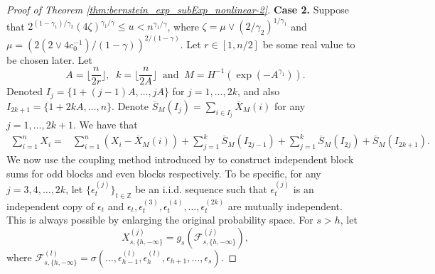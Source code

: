 \documentclass[11pt]{article}
\theoremstyle{plain}
\theoremstyle{definition}
\begin{document}
\begin{proof}[Proof of Theorem \ref{thm:bernstein_exp_subExp_nonlinear-2}]
\textbf{Case 2.} Suppose that $2^{(1-\gamma_1)/\gamma_2}(4\zeta)^{\gamma_1/\gamma} \leq u < n^{\gamma_1/\gamma}$, where $\zeta = \mu \vee (2/\gamma_2)^{1/\gamma_1}$ and $\mu = (2(2 \vee 4c_0^{-1})/(1-\gamma))^{2/(1-\gamma)}$. Let $r \in [1, n/2]$ be some real value to be chosen later. Let
\begin{equation*}
    A = \Big\lfloor \frac{n}{2r} \Big\rfloor, \;\; k = \Big\lfloor \frac{n}{2A} \Big\rfloor \;\; \text{and} \;\; M = H^{-1}(\exp(-A^{\gamma_1})).
\end{equation*}
Denoted $I_j = \{1+(j-1)A, \dots, jA\}$ for $j = 1, \dots, 2k$, and also $I_{2k+1} = \{1+2kA, \dots, n\}$. Denote $\overline{S}_M(I_j) = \sum_{i \in I_{j}}\overline{X}_M(i)$ for any $j = 1, \dots, 2k+1$. We have that
\begin{equation}\label{eq:decomp_odd_even}
\begin{aligned}
    \sum_{i = 1}^nX_i =& \sum_{i = 1}^n(X_i - \overline{X}_M(i)) + \sum_{j = 1}^k\overline{S}_M(I_{2j-1}) + \sum_{j = 1}^k\overline{S}_M(I_{2j}) + \overline{S}_M( I_{2k+1}).
\end{aligned}
\end{equation}
We now use the coupling method introduced by \cite{berkes2009asymptotic} to construct independent block sums for odd blocks and even blocks respectively. To be specific, for any $j = 3, 4, \dots, 2k$, let $\{\epsilon_t^{(j)}\}_{t \in \mathbb{Z}}$ be an i.i.d. sequence such that $\epsilon_t^{(j)}$ is an independent copy of $\epsilon_t$ and $\epsilon_t, \epsilon_t^{(3)}, \epsilon_t^{(4)}, \dots, \epsilon_t^{(2k)}$ are mutually independent. This is always possible by enlarging the original probability space. For $s > h$, let 
\begin{equation}\label{eq:coupling_block}
    X_{s, \{h, -\infty\}}^{(j)} = g_s(\mathcal{F}_{s, \{h, -\infty\}}^{(j)}),
\end{equation}
where $\mathcal{F}_{s, \{h, -\infty\}}^{(l)} = \sigma(\dots, \epsilon_{h-1}^{(l)}, \epsilon_h^{(l)}, \epsilon_{h+1}, \dots, \epsilon_s)$. 


\end{proof}
\end{document}
